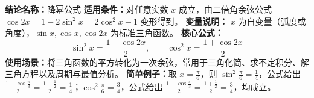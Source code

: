 \textbf{结论名称：}降幂公式  
\textbf{适用条件：}对任意实数 \(x\) 成立，由二倍角余弦公式 \(\cos 2x = 1-2\sin^2 x = 2\cos^2 x -1\) 变形得到。  
\textbf{变量说明：} \(x\) 为自变量（弧度或角度），\(\sin x,\cos x,\cos 2x\) 为标准三角函数。  
\textbf{核心公式：}\[
\boxed{\sin^2 x = \frac{1-\cos 2x}{2}},\qquad 
\boxed{\cos^2 x = \frac{1+\cos 2x}{2}}
\]  
\textbf{使用场景：}将三角函数的平方转化为一次余弦，常用于三角化简、求不定积分、解三角方程以及周期与最值分析。  
\textbf{简单例子：}取 \(x=\frac{\pi}{6}\)，则 \(\sin^2\frac{\pi}{6}=\frac{1}{4}\)，公式给出 \(\frac{1-\cos\frac{\pi}{3}}{2}=\frac{1-\frac12}{2}=\frac14\)；\(\cos^2\frac{\pi}{6}=\frac{3}{4}\)，公式给出 \(\frac{1+\cos\frac{\pi}{3}}{2}=\frac{1+\frac12}{2}=\frac34\)，均成立。